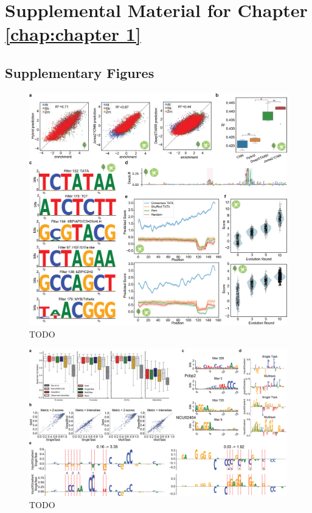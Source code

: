 \appendix{}

\chapter{Supplemental Material for Chapter \ref{chap:chapter 1}}

\section{Supplementary Figures}

\begin{figure}[p]
    \centering
    \includegraphics[width=\textwidth]{1_figures-and-files/suppfigure1.png}
    \caption[TODO]{TODO
    }
    \label{fig:supplementary_1}
\end{figure}

\begin{figure}[p]
    \centering
    \includegraphics[width=\textwidth]{1_figures-and-files/suppfigure2.png}
    \caption[TODO]{TODO
    }
    \label{fig:supplementary_2}
\end{figure}

